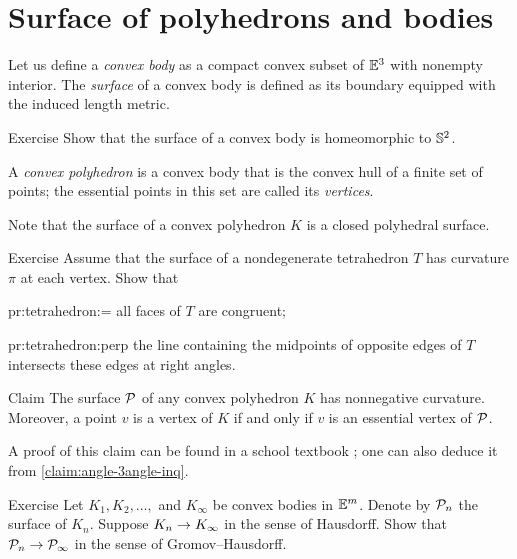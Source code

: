 \section{Surface of polyhedrons and bodies}

Let us define a \emph{convex body} as a compact convex subset of $\mathbb{E}^3$ with nonempty interior.
The \emph{surface} of a convex body is defined as its boundary equipped with the induced length metric.

\begin{thm}[!]{Exercise}\label{ex:surf-S2}
Show that the surface of a convex body is homeomorphic to $\mathbb{S}^2$.
\end{thm}

A \emph{convex polyhedron} is a convex body
that is the convex hull of a finite set of points; the essential points in this set are called its \emph{vertices}.

Note that the surface of a convex polyhedron $K$ is a closed polyhedral surface.

\begin{thm}{Exercise}\label{pr:tetrahedron}
Assume that the surface of a nondegenerate tetrahedron $T$ has curvature $\pi$ at each vertex.
Show that

\begin{subthm}{pr:tetrahedron:=}
all faces of $T$ are congruent;
\end{subthm}

\begin{subthm}{pr:tetrahedron:perp} the line containing the midpoints of opposite edges of $T$ intersects these edges at right angles.
\end{subthm}

\end{thm}

\begin{thm}{Claim}\label{clm:total-angle}
The surface $\mathcal{P}$ of any convex polyhedron $K$ has nonnegative curvature.
Moreover, a point $v$ is a vertex of $K$ if and only if
$v$ is an essential vertex of $\mathcal{P}$.
\end{thm}

A proof of this claim can be found in a school textbook \cite[§~48]{kiselev-stereo-en};
one can also deduce it from \ref{claim:angle-3angle-inq}.

\begin{thm}[!]{Exercise}\label{ex:surface-covergence}
Let $K_1,K_2,\dots,$ and $K_\infty$ be convex bodies in $\mathbb{E}^m$.
Denote by $\mathcal{P}_n$ the surface of $K_n$.
Suppose $K_n\z\to K_\infty$ in the sense of Hausdorff.
Show that $\mathcal{P}_n\to \mathcal{P}_\infty$ in the sense of Gromov--Hausdorff.
\end{thm}

